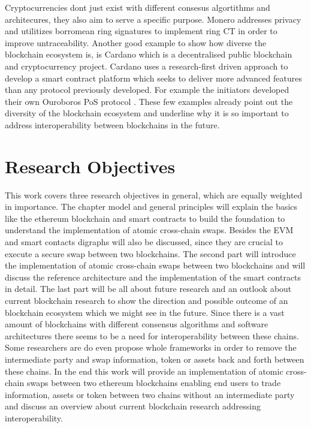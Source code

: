Cryptocurrencies dont just exist with different consesus algortithms and architecures, they also aim to serve a specific purpose. Monero addresses privacy and utilitizes borromean ring signatures
\cite{maxwell2015borromean} to implement ring \ac{CT} \cite{noether2016ring} in order to improve untraceability.
Another good example to show how diverse the blockchain ecosystem is, is Cardano which is a decentralised public blockchain and cryptocurrency project. Cardano uses a research-first driven approach to develop a smart contract platform which seeks to deliver more advanced features than any protocol previously developed. For example the initiators developed their own Ouroboros \ac{PoS} protocol \cite{kiayias2017ouroboros}. These few examples already point out the diversity of the blockchain ecosystem and underline why it is so important to address interoperability between blockchains in the future.




%
%
\section{Research Objectives}
\label{sec:intro:goal}
This work covers three research objectives in general, which are equally weighted in importance. The chapter model and general principles will explain the basics like the ethereum blockchain and smart contracts to build the foundation to understand the implementation of atomic cross-chain swaps. Besides the \ac{EVM} and smart contacts digraphs will also be discussed, since they are crucial to execute a secure swap between two blockchains. The second part will introduce the implementation of atomic cross-chain swaps between two blockchains and will discuss the reference architecture and the implementation of the smart contracts in detail. The last part will be all about future research and an outlook about current blockchain research to show the direction and possible outcome of an blockchain ecosystem which we might see in the future. Since there is a vast amount of blockchains with different consensus algorithms and software architectures there seems to be a need for interoperability between these chains. Some researchers are do even propose whole frameworks in order to remove the intermediate party and swap information, token or assets back and forth between these chains. In the end this work will provide an implementation of atomic cross-chain swaps between two ethereum blockchains enabling end users to trade information, assets or token between two chains without an intermediate party and discuss an overview about current blockchain research addressing interoperability.



